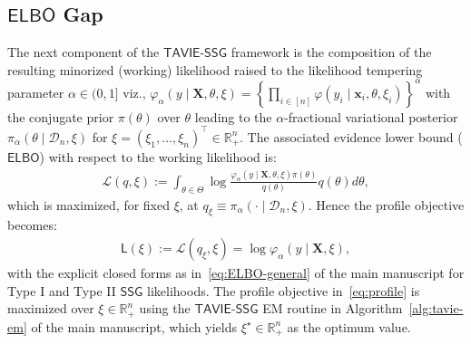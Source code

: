 \documentclass[12pt]{article}
\numberwithin{equation}{section}
\newcommand{\ssg}{\mathsf{SSG}}
\newcommand{\tssg}{\mathsf{TAVIE}\text{-}\mathsf{SSG}}
\begin{document}
\subsection{\texorpdfstring{$\mathsf{ELBO}$}{ELBO} Gap}\label{subsec:ELBO-gap}
\label{sec:elbo-gap}
The next component of the $\tssg$ framework is the composition of the resulting minorized (working) likelihood raised to the likelihood tempering parameter $\alpha \in (0, 1]$ viz., $\varphi_{\alpha}(y\mid \mathbf{X}, \theta, \xi) = \left\{\prod_{i\in [n]}\varphi(y_i \mid \mathbf x_i, \theta, \xi_i)\right\}^{\alpha}$ with the conjugate prior $\pi(\theta)$ over $\theta$ leading to the $\alpha$-fractional variational posterior $\pi_{\alpha}(\theta \mid \mathcal{D}_n, \xi)$ for $\xi = (\xi_1, \ldots, \xi_n)^{\top}\in \mathbb{R}^{n}_+$. The associated evidence lower bound ($\mathsf{ELBO}$) with respect to the working likelihood is:
\begin{align}
\label{eq:TAVIE-SSG-ELBO}
\mathcal{L}(q, \xi) := \int_{\theta\in \Theta}\log\frac{\varphi_{\alpha}(y\mid \mathbf X, \theta, \xi) \pi(\theta)}{q(\theta)}q(\theta)d\theta,
\end{align}
which is maximized, for fixed $\xi$, at $q_{\xi}\equiv \pi_{\alpha}(\cdot\mid \mathcal D_n, \xi)$. Hence the profile objective becomes:
\begin{align}
\label{eq:profile}
\mathsf{L}(\xi) := \mathcal{L}(q_\xi, \xi) = \log \varphi_{\alpha}(y\mid \mathbf X, \xi),
\end{align}
with the explicit closed forms as in~\eqref{eq:ELBO-general} of the main manuscript for Type I and Type II $\ssg$ likelihoods. The profile objective in~\eqref{eq:profile} is maximized over $\xi\in \mathbb{R}^{n}_+$ using the $\tssg$ EM routine in Algorithm~\ref{alg:tavie-em} of the main manuscript, which yields $\xi^\star \in \mathbb{R}^{n}_+$ as the optimum value. 
\end{document}
